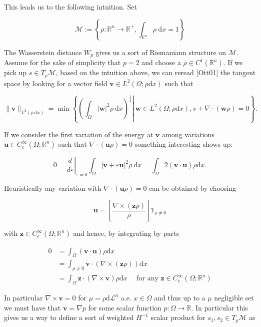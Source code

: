 \documentclass[10pt]{article}
\begin{document}
This leads us to the following intuition. Set

\[
\mathcal{M}:=\left\{\rho: \mathbb{R}^{n} \rightarrow \mathbb{R}^{+}, \int_{\mathbb{R}^{n}} \rho \mathrm{~d} x=1\right\}
\]

The Wasserstein distance \(W_{p}\) gives us a sort of Riemaniann structure on \(\mathcal{M}\). Assume for the sake of simplicity that \(p=2\) and choose a \(\rho \in C^{1}\left(\mathbb{R}^{n}\right)\). If we pick up \(s \in T_{\rho} \mathcal{M}\), based on the intuition above, we can reread [Ott01] the tangent space by looking for a vector field \(\mathbf{v} \in L^{2}(\Omega ; \rho \mathrm{d} x)\) such that

\[
\|\mathbf{v}\|_{L^{2}(\rho \mathrm{~d} x)}=\min \left\{\left.\left(\int_{\Omega}|\mathbf{w}|^{2} \rho \mathrm{~d} x\right)^{\frac{1}{2}} \right\rvert\, \mathbf{w} \in L^{2}(\Omega ; \rho \mathrm{d} x), s+\nabla \cdot(\mathbf{w} \rho)=0\right\} .
\]

If we consider the first variation of the energy at \(\mathbf{v}\) among variations \(\mathbf{u} \in C_{c}^{\infty}\left(\Omega ; \mathbb{R}^{n}\right)\) such that \(\nabla \cdot(\mathbf{u} \rho)=0\) something interesting shows up:

\[
0=\left.\frac{d}{d \varepsilon}\right|_{\varepsilon=0} \int_{\Omega}|\mathbf{v}+\varepsilon \mathbf{u}|^{2} \rho \mathrm{~d} x=\int_{\Omega} 2(\mathbf{v} \cdot \mathbf{u}) \rho \mathrm{d} x .
\]

Heuristically any variation with \(\nabla \cdot(\mathbf{u} \rho)=0\) can be obtained by choosing

\[
\mathbf{u}=\left[\frac{\nabla \times(\mathbf{z} \rho)}{\rho}\right] \mathbb{1}_{\rho \neq 0}
\]

with \(\mathbf{z} \in C_{c}^{\infty}\left(\Omega ; \mathbb{R}^{n}\right)\) and hence, by integrating by parts

\[
\begin{aligned}
0 & =\int_{\Omega}(\mathbf{v} \cdot \mathbf{u}) \rho \mathrm{d} x \\
& =\int_{\rho \neq 0} \mathbf{v} \cdot(\nabla \times(\mathbf{z} \rho)) \mathrm{d} x \\
& =\int_{\Omega} \mathbf{z} \cdot(\nabla \times \mathbf{v}) \rho \mathrm{d} x \quad \text { for any } \mathbf{z} \in C_{c}^{\infty}\left(\Omega ; \mathbb{R}^{n}\right)
\end{aligned}
\]

In particular \(\nabla \times \mathbf{v}=0\) for \(\mu=\rho \mathrm{d} \mathcal{L}^{n}\) a.e. \(x \in \Omega\) and thus up to a \(\mu\) negligible set we must have that \(\mathbf{v}=\nabla p\) for some scalar function \(p: \Omega \rightarrow \mathbb{R}\). In particular this gives us a way to define a sort of weighted \(H^{-1}\) scalar product for \(s_{1}, s_{2} \in T_{\rho} \mathcal{M}\) as
\end{document}
